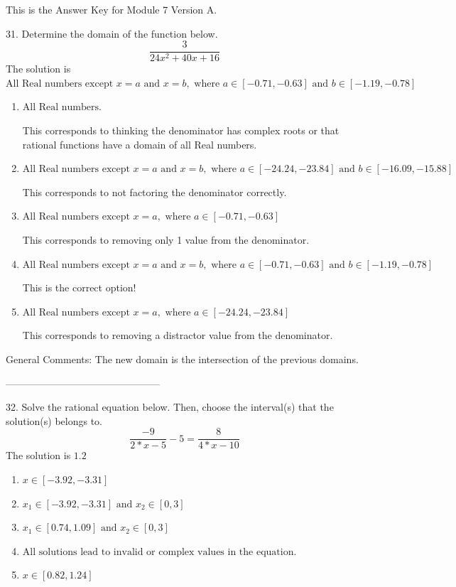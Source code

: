 \documentclass{article}[10pt]
\begin{document}
This is the Answer Key for Module 7 Version A.

31. Determine the domain of the function below.
$$ \frac{3}{24 x^2 + 40 x + 16} $$ 
The solution is $ \text{All Real numbers except } x = a \text{ and } x = b, \text{ where } a \in [-0.71, -0.63] \text{ and } b \in [-1.19, -0.78] $ 

\begin{enumerate}[label=\Alph*.] 
\item $ \text{All Real numbers.} $ 

 This corresponds to thinking the denominator has complex roots or that rational functions have a domain of all Real numbers. 
\item $ \text{All Real numbers except } x = a \text{ and } x = b, \text{ where } a \in [-24.24, -23.84] \text{ and } b \in [-16.09, -15.88] $ 

 This corresponds to not factoring the denominator correctly. 
\item $ \text{All Real numbers except } x = a, \text{ where } a \in [-0.71, -0.63] $ 

 This corresponds to removing only 1 value from the denominator. 
\item $ \text{All Real numbers except } x = a \text{ and } x = b, \text{ where } a \in [-0.71, -0.63] \text{ and } b \in [-1.19, -0.78] $ 

 This is the correct option! 
\item $ \text{All Real numbers except } x = a, \text{ where } a \in [-24.24, -23.84] $ 

 This corresponds to removing a distractor value from the denominator. 
\end{enumerate} 
 
General Comments: The new domain is the intersection of the previous domains.

-----------------------------------------------

32. Solve the rational equation below. Then, choose the interval(s) that the solution(s) belongs to.
$$ \frac{-9}{2*x - 5} - 5 = \frac{8}{4*x - 10} $$ 
The solution is $ 1.2 $ 

\begin{enumerate}[label=\Alph*.] 
\item $ x \in [-3.92,-3.31] $ 

  
\item $ x_1 \in [-3.92, -3.31] \text{ and } x_2 \in [0,3] $ 

  
\item $ x_1 \in [0.74, 1.09] \text{ and } x_2 \in [0,3] $ 

  
\item $ \text{All solutions lead to invalid or complex values in the equation.} $ 

  
\item $ x \in [0.82,1.24] $ 

  
\end{enumerate} 
 
\end{document}
